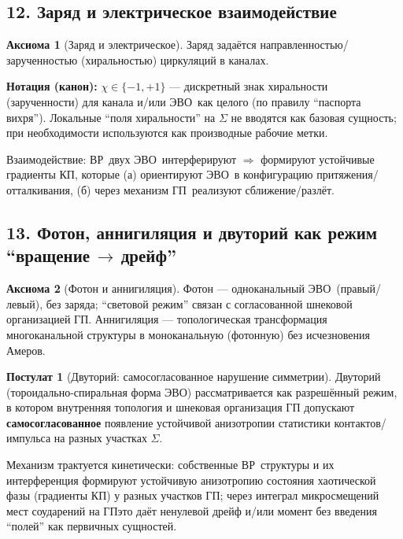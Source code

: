 \documentclass[12pt]{article}
\newcommand{\EVO}{\mbox{\textsc{ЭВО}}}
\newcommand{\GP}{\mbox{\textsc{ГП}}}
\newcommand{\KP}{\mbox{\textsc{КП}}}
\newcommand{\VR}{\mbox{\textsc{ВР}}}
\theoremstyle{definition}
\newtheorem{axiom}{Аксиома}[section]
\newtheorem{postulate}{Постулат}[section]
\theoremstyle{plain}
\theoremstyle{remark}
\begin{document}
\subsection{12. Заряд и электрическое взаимодействие}
\begin{axiom}[Заряд и электрическое]
Заряд задаётся направленностью/зарученностью (хиральностью) циркуляций в каналах.

\textbf{Нотация (канон):} \(\chi\in\{-1,+1\}\) — дискретный знак хиральности (зарученности) для канала и/или \EVO\ как целого
(по правилу ``паспорта вихря''). Локальные ``поля хиральности'' на \(\Sigma\) не вводятся как базовая сущность; при необходимости
используются как производные рабочие метки.

Взаимодействие: \VR\ двух \EVO\ интерферируют $\Rightarrow$ формируют устойчивые градиенты \KP, которые
(а) ориентируют \EVO\ в конфигурацию притяжения/отталкивания,
(б) через механизм \GP\ реализуют сближение/разлёт.
\end{axiom}

\subsection{13. Фотон, аннигиляция и двуторий как режим ``вращение\,$\to$\,дрейф''}
\begin{axiom}[Фотон и аннигиляция]
Фотон — одноканальный \EVO\ (правый/левый), без заряда; ``световой режим'' связан с согласованной шнековой организацией \GP.
Аннигиляция — топологическая трансформация многоканальной структуры в моноканальную (фотонную) без исчезновения Амеров.
\end{axiom}

\begin{postulate}[Двуторий: самосогласованное нарушение симметрии]
Двуторий (тороидально-спиральная форма \EVO) рассматривается как разрешённый режим, в котором внутренняя топология и шнековая организация \GP
допускают \textbf{самосогласованное} появление устойчивой анизотропии статистики контактов/импульса на разных участках \(\Sigma\).

Механизм трактуется кинетически: собственные \VR\ структуры и их интерференция формируют устойчивую анизотропию состояния хаотической фазы
(градиенты \KP) у разных участков \GP; через интеграл микросмещений мест соударений на \GP это даёт ненулевой дрейф и/или момент
без введения ``полей'' как первичных сущностей.
\end{postulate}

\end{document}
